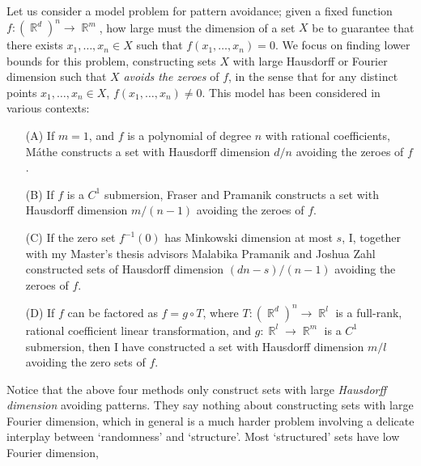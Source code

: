 \documentclass[11pt]{article}
\DeclareMathOperator{\RR}{\mathbb{R}}
\begin{document}

Let us consider a model problem for pattern avoidance; given a fixed function $f: (\RR^d)^n \to \RR^m$, how large must the dimension of a set $X$ be to guarantee that there exists $x_1,\dots,x_n \in X$ such that $f(x_1,\dots,x_n) = 0$. We focus on finding lower bounds for this problem, constructing sets $X$ with large Hausdorff or Fourier dimension such that $X$ \emph{avoids the zeroes} of $f$, in the sense that for any distinct points $x_1,\dots,x_n \in X$, $f(x_1,\dots,x_n) \neq 0$. This model has been considered in various contexts:
%
\begin{itemize}
	\item[(A)] If $m = 1$, and $f$ is a polynomial of degree $n$ with rational coefficients, M\'{a}the \cite{Mathe} constructs a set with Hausdorff dimension $d/n$ avoiding the zeroes of $f$.

	\item[(B)] If $f$ is a $C^1$ submersion, Fraser and Pramanik \cite{FraserPramanik} constructs a set with Hausdorff dimension $m/(n-1)$ avoiding the zeroes of $f$. 

	\item[(C)] If the zero set $f^{-1}(0)$ has Minkowski dimension at most $s$, I, together with my Master's thesis advisors Malabika Pramanik and Joshua Zahl \cite{DensonPramanikZahl} constructed sets of Hausdorff dimension $(dn - s)/(n-1)$ avoiding the zeroes of $f$.

	\item[(D)] If $f$ can be factored as $f = g \circ T$, where $T: (\RR^d)^n \to \RR^l$ is a full-rank, rational coefficient linear transformation, and $g: \RR^l \to \RR^m$ is a $C^1$ submersion, then I \cite{DensonCharacterization} have constructed a set with Hausdorff dimension $m/l$ avoiding the zero sets of $f$.
\end{itemize}
%
Notice that the above four methods only construct sets with large \emph{Hausdorff dimension} avoiding patterns. They say nothing about constructing sets with large Fourier dimension, which in general is a much harder problem involving a delicate interplay between `randomness' and `structure'. Most `structured' sets have low Fourier dimension,%
\end{document}
